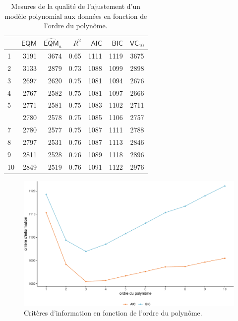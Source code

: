 \documentclass[
  11pt,
  letterpaper,
]{book}
\theoremstyle{definition}
\theoremstyle{remark}
\begin{document}
\hypertarget{tbl-polynome-ajustement}{}
\begin{table}
\caption{\label{tbl-polynome-ajustement}Mesures de la qualité de l'ajustement d'un modèle polynomial aux données
en fonction de l'ordre du polynôme. }\tabularnewline

\centering
\begin{tabular}{lrrrrrr}
\toprule
  & \(\mathsf{EQM}\) & \(\widehat{\mathsf{EQM}}_a\) & \(R^2\) & \(\mathsf{AIC}\) & \(\mathsf{BIC}\) & \(\mathsf{VC}_{10}\)\\
\midrule
1 & 3191 & 3674 & 0.65 & 1111 & 1119 & 3675\\
2 & 3133 & 2879 & 0.73 & 1088 & 1099 & 2898\\
3 & 2697 & 2620 & 0.75 & 1081 & 1094 & 2676\\
4 & 2767 & 2582 & 0.75 & 1081 & 1097 & 2666\\
5 & 2771 & 2581 & 0.75 & 1083 & 1102 & 2711\\
\addlinespace
6 & 2780 & 2578 & 0.75 & 1085 & 1106 & 2757\\
7 & 2780 & 2577 & 0.75 & 1087 & 1111 & 2788\\
8 & 2797 & 2531 & 0.76 & 1087 & 1113 & 2846\\
9 & 2811 & 2528 & 0.76 & 1089 & 1118 & 2896\\
10 & 2849 & 2519 & 0.76 & 1091 & 1122 & 2976\\
\bottomrule
\end{tabular}
\end{table}

\begin{figure}[ht!]

{\centering \includegraphics[width=1\textwidth,height=\textheight]{./04-selectionmodeles_files/figure-pdf/fig-polynome-ajustement-1.pdf}

}

\caption{\label{fig-polynome-ajustement}Critères d'information en
fonction de l'ordre du polynôme.}

\end{figure}
\end{document}
